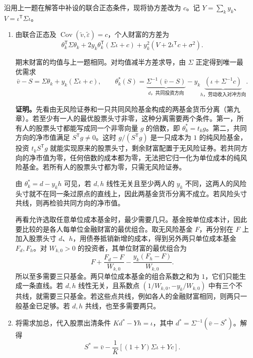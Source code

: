 \begin{solution}[blank-type=manual,blank-vsep=9\baselineskip]
沿用上一题在解答中补设的联合正态条件，现将协方差改为 $c$。记 $Y=\sum_ky_k$、$V=\iota^{\mathsf T}\Sigma\iota$。
\begin{enumerate}[label=(\alph*)]
\item 由联合正态及 $\operatorname{Cov}(\widetilde v,\widetilde\varepsilon)=c$，个人财富的方差为
\[
 \theta_k^{\mathsf T}\Sigma\theta_k+2y_k\theta_k^{\mathsf T}(\Sigma\iota+c)
 +y_k^2(V+2\iota^{\mathsf T}c+\sigma^2).
\]

期末财富的均值与上一题相同。对均值减半方差求导，由 $\Sigma$ 正定得到唯一最优需求
\[
 \bar v-S=\Sigma\theta_k+y_k(\Sigma\iota+c),
 \qquad
 \boxed{\theta_k^*(S)=\underbrace{\Sigma^{-1}(\bar v-S)}_{d\text{，共同投资方向}}
 -y_k\underbrace{(\iota+\Sigma^{-1}c)}_{h\text{，劳动收入对冲方向}}}.
\]

\textbf{证明。}先看由无风险证券和一只共同风险基金构成的两基金货币分离\ifdefined\WJHandoutKnowledge（第九章）\fi。若至少有一人的最优股票头寸非零，这种分离需要两个条件。第一，所有人的股票头寸都能写成同一个非零向量 $g$ 的倍数，即 $\theta_k^*=t_k g$。第二，共同方向的净市值满足 $S^{\mathsf T}g\ne0$。这时 $g/(S^{\mathsf T}g)$ 是一只成本为 $1$ 的纯风险基金，投资 $t_kS^{\mathsf T}g$ 就能实现原来的股票头寸，剩余财富配置于无风险证券。若共同方向的净市值为零，任何倍数的成本都为零，无法把它归一化为单位成本的纯风险基金。若所有人的股票头寸都为零，只需无风险证券。

由 $\theta_k^*=d-y_kh$ 可见，若 $d,h$ 线性无关且至少两人的 $y_k$ 不同，这两人的风险头寸就不在同一条过原点的直线上，因此两基金货币分离不成立。若风险头寸共线，则再检验共同方向的净市值。

\smallskip
再看允许选取任意单位成本基金时，最少需要几只。基金按单位成本计，因此要比较的是各人每单位金融财富的最优组合。取无风险基金 $F$，再分别在 $F$ 上加入股票头寸 $d$、$h$，用债券抵销新增的成本，得到另外两只单位成本基金 $F_d,F_h$。对 $W_{k,0}>0$ 的投资者，其单位财富的最优组合为
\[
 F+\frac{F_d-F}{W_{k,0}}-\frac{y_k(F_h-F)}{W_{k,0}}.
\]
所以至多需要三只基金。两只单位成本基金的组合系数之和为 $1$，它们只能生成一条直线。若 $d,h$ 线性无关，且系数点 $(1/W_{k,0},-y_k/W_{k,0})$ 中有三个不共线，就需要三只基金。若这些点共线，例如各人的金融财富相同，则两只一般基金已足够。若 $d,h$ 共线，也至多需要两只。

\item 将需求加总，代入股票出清条件 $Kd^*-Yh=\iota$，其中 $d^*=\Sigma^{-1}(\bar v-S^*)$。解得
\[
 \boxed{S^*=\bar v-\frac1K[(1+Y)\Sigma\iota+Yc]}.
\]


\end{enumerate}
\end{solution}
